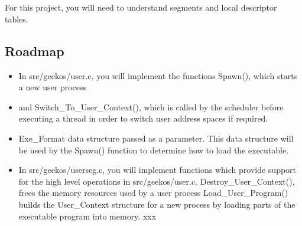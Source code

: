 
%


\section{}

For this project, you will need to understand segments and local descriptor tables.



\subsection{Roadmap}
\begin{itemize}
  \item In src/geekos/user.c, you will implement the functions Spawn(), which starts a new user process
  \item and Switch\_To\_User\_Context(), 
		which is called by the scheduler before executing a thread in order to switch user address spaces if required.
  \item Exe\_Format data structure passed as a parameter. 
  		This data structure will be used by the Spawn() function to determine how to load the executable.
  \item In src/geekos/userseg.c, 
   		you will implement functions which provide support for the high level operations in src/geekos/user.c.
   		\subitem Destroy\_User\_Context(), frees the memory resources used by a user process
   		\subitem Load\_User\_Program() builds the User\_Context structure for a new process by loading parts of the executable program into memory.
   		\subitem xxx
\end{itemize}

























%